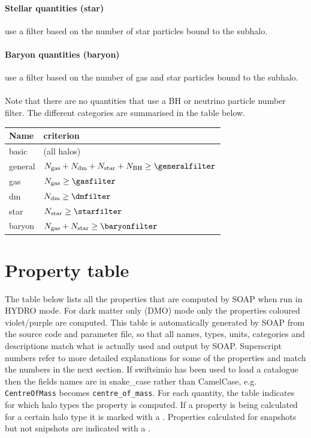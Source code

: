 \documentclass{article}
\begin{document}
\paragraph{Stellar quantities (star)} use a filter based on the number of star particles bound to the 
subhalo.

\paragraph{Baryon quantities (baryon)} use a filter based on the number of gas and star particles 
bound to the subhalo.

\paragraph{}Note that there are no quantities that use a BH or neutrino particle number filter.
The different categories are summarised in the table below.

\begin{longtable}{ll}
Name & criterion \\
\hline{}basic & (all halos) \\
general & $N_{\rm{}gas}+N_{\rm{}dm}+N_{\rm{}star}+N_{\rm{}BH} \geq{} \generalfilter$ \\
gas & $N_{\rm{}gas} \geq{} \gasfilter$ \\
dm & $N_{\rm{}dm} \geq{} \dmfilter$ \\
star & $N_{\rm{}star} \geq{} \starfilter$ \\
baryon & $N_{\rm{}gas}+N_{\rm{}star} \geq{} \baryonfilter$ \\
\end{longtable}

\section{Property table}

The table below lists all the properties that are computed by SOAP when run in HYDRO mode.
For dark matter only (DMO) mode only the properties coloured violet/purple are computed.
This table is automatically generated by SOAP from the source code and parameter file, so that all
names, types, units, categories and descriptions match what is actually
used and output by SOAP.
Superscript numbers refer to more detailed explanations for some of the properties and match the numbers in
the next section. If swiftsimio has been used to load a catalogue then the fields names are in snake\_case rather
than CamelCase, e.g. \verb+CentreOfMass+ becomes \verb+centre_of_mass+. For each quantity, the table
indicates for which halo types the property is computed. If a property is being calculated 
for a certain halo type it is marked with a . Properties calculated
for snapshots but not snipshots are indicated with a .
\end{document}
